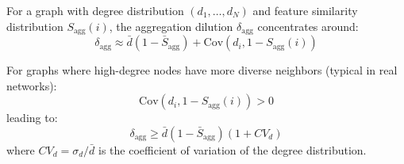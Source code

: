 \begin{lemma}
\label{lem:concentration}
For a graph with degree distribution $(d_1, \ldots, d_N)$ and feature similarity distribution $S_{\text{agg}}(i)$, the aggregation dilution $\delta_{\text{agg}}$ concentrates around:
\begin{equation}
\delta_{\text{agg}} \approx \bar{d}(1 - \bar{S}_{\text{agg}}) + \text{Cov}(d_i, 1 - S_{\text{agg}}(i))
\end{equation}

For graphs where high-degree nodes have more diverse neighbors (typical in real networks):
\begin{equation}
\text{Cov}(d_i, 1 - S_{\text{agg}}(i)) > 0
\end{equation}
leading to:
\begin{equation}
\delta_{\text{agg}} \geq \bar{d}(1 - \bar{S}_{\text{agg}})(1 + CV_d)
\end{equation}
where $CV_d = \sigma_d/\bar{d}$ is the coefficient of variation of the degree distribution.
\end{lemma}

